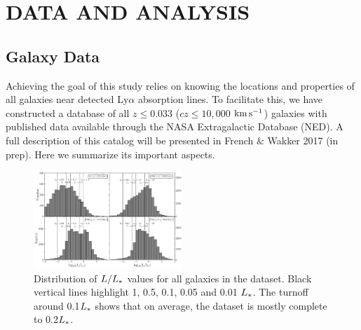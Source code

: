 \documentclass[twocolumn,tighten]{aastex6}
\begin{document}
\section{DATA AND ANALYSIS}


\subsection{Galaxy Data}
Achieving the goal of this study relies on knowing the locations and properties of all galaxies near detected Ly$\alpha$ absorption lines. To facilitate this, we have constructed a database of all $z\leq 0.033$ ($cz\leq 10,000$ $\rm km\, s^{-1}$) galaxies with published data available through the NASA Extragalactic Database (NED). A full description of this catalog will be presented in French $\&$ Wakker 2017 (in prep). Here we summarize its important aspects. 

\begin{figure}[ht!]
        \centering
        \vspace{0pt}
        \includegraphics[width=0.50\textwidth]{fig1.pdf}
        \caption{\small{Distribution of $L/L_{\**}$ values for all galaxies in the dataset. Black vertical lines highlight 1, 0.5, 0.1, 0.05 and 0.01 $L_{\**}$. The turnoff around 0.1$L_{\**}$ shows that on average, the dataset is mostly complete to 0.2$L_{\**}$.}}
        \label{completeness}
\end{figure} 
\end{document}
